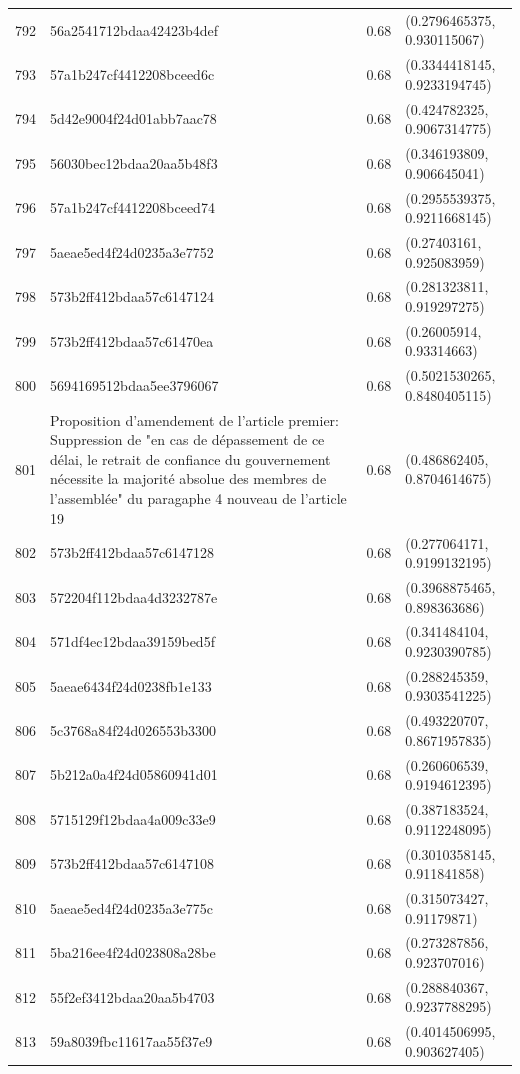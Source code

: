 \begin{table}[ht]
\begin{tabular}{rlrl}
  792 & 56a2541712bdaa42423b4def & 0.68 & (0.2796465375, 0.930115067) \\ 
  793 & 57a1b247cf4412208bceed6c & 0.68 & (0.3344418145, 0.9233194745) \\ 
  794 & 5d42e9004f24d01abb7aac78 & 0.68 & (0.424782325, 0.9067314775) \\ 
  795 & 56030bec12bdaa20aa5b48f3 & 0.68 & (0.346193809, 0.906645041) \\ 
  796 & 57a1b247cf4412208bceed74 & 0.68 & (0.2955539375, 0.9211668145) \\ 
  797 & 5aeae5ed4f24d0235a3e7752 & 0.68 & (0.27403161, 0.925083959) \\ 
  798 & 573b2ff412bdaa57c6147124 & 0.68 & (0.281323811, 0.919297275) \\ 
  799 & 573b2ff412bdaa57c61470ea & 0.68 & (0.26005914, 0.93314663) \\ 
  800 & 5694169512bdaa5ee3796067 & 0.68 & (0.5021530265, 0.8480405115) \\ 
  801 & Proposition d'amendement de l'article premier: Suppression de "en cas de dépassement de ce délai, le retrait de confiance du gouvernement nécessite la majorité absolue des membres de l'assemblée" du paragaphe 4 nouveau de l'article 19 & 0.68 & (0.486862405, 0.8704614675) \\ 
  802 & 573b2ff412bdaa57c6147128 & 0.68 & (0.277064171, 0.9199132195) \\ 
  803 & 572204f112bdaa4d3232787e & 0.68 & (0.3968875465, 0.898363686) \\ 
  804 & 571df4ec12bdaa39159bed5f & 0.68 & (0.341484104, 0.9230390785) \\ 
  805 & 5aeae6434f24d0238fb1e133 & 0.68 & (0.288245359, 0.9303541225) \\ 
  806 & 5c3768a84f24d026553b3300 & 0.68 & (0.493220707, 0.8671957835) \\ 
  807 & 5b212a0a4f24d05860941d01 & 0.68 & (0.260606539, 0.9194612395) \\ 
  808 & 5715129f12bdaa4a009c33e9 & 0.68 & (0.387183524, 0.9112248095) \\ 
  809 & 573b2ff412bdaa57c6147108 & 0.68 & (0.3010358145, 0.911841858) \\ 
  810 & 5aeae5ed4f24d0235a3e775c & 0.68 & (0.315073427, 0.91179871) \\ 
  811 & 5ba216ee4f24d023808a28be & 0.68 & (0.273287856, 0.923707016) \\ 
  812 & 55f2ef3412bdaa20aa5b4703 & 0.68 & (0.288840367, 0.9237788295) \\ 
  813 & 59a8039fbc11617aa55f37e9 & 0.68 & (0.4014506995, 0.903627405) \\ 

\end{tabular}
\end{table}
